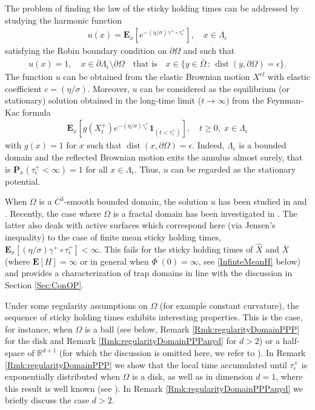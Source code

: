 \documentclass[11pt,a4paper]{article}
\begin{document}
{The problem of finding the law of the sticky holding times can be addressed by studying the harmonic function
\begin{align*}
u(x) = \mathbf{E}_x \left[ e^{-(\eta /\sigma) \gamma^+ \circ \tau^+_\epsilon} \right], \quad x \in \Lambda_\epsilon
\end{align*}
satisfying the Robin boundary condition on $\partial \Omega$ and such that 
\begin{align*}
u(x)=1, \quad x \in \partial \Lambda_\epsilon \setminus \partial \Omega \quad \textrm{that is} \quad x \in \{y \in \bar{\Omega}\,:\, \operatorname{dist}(y, \partial \Omega)=\epsilon\}.
\end{align*}
The function $u$ can be  obtained from the elastic Brownian motion $X^{el}$ with elastic coefficient $c=(\eta/\sigma)$. Moreover, $u$ can be considered as the equilibrium (or stationary) solution obtained in the long-time limit ($t\to \infty$) from the Feynman-Kac formula 
\begin{align*}
\mathbf{E}_x \left[ g(X^+_t) e^{-(\eta/\sigma) \gamma^+_t}\mathbf{1}_{(t < \tau^+_\epsilon)} \right], \quad t\geq 0,\; x \in \Lambda_\epsilon
\end{align*}
with $g(x)=1$ for $x$ such that $\operatorname{dist}(x, \partial \Omega) = \epsilon$. Indeed, $\Lambda_\epsilon$ is a bounded domain and the reflected Brownian motion exits the annulus almost surely, that is $\mathbf{P}_x(\tau^+_\epsilon < \infty) = 1$  for all $x \in \Lambda_\epsilon$. Thus, $u$ can be regarded as the stationary potential.

When $\Omega$ is a $C^3$-smooth bounded domain, the solution $u$ has been studied in \cite{MS90} and \cite{Pap90}. Recently, the case where $\Omega$ is a fractal domain has been investigated in \cite{BBC08}. The latter also deals with active surfaces which correspond here (via Jensen's inequality) to the case of finite mean sticky holding times, $\mathbf{E}_{x}[(\eta/\sigma)\gamma^+ \circ \tau^+_\epsilon] < \infty$. This fails for the sticky holding times of $\hat{X}$ and $\bar{X}$ (where $\mathbf{E}[H] = \infty$ or in general when $\Phi^\prime(0)=\infty$, see \eqref{InfinteMeanH} below) and provides a characterization of trap domains in line with the discussion in Section \ref{Sec:ConOP}.   

Under some regularity assumptions on $\Omega$ (for example constant curvature), the sequence of sticky holding times exhibits interesting properties. This is the case, for instance, when $\Omega$ is a ball (see below, Remark \ref{Rmk:regularityDomainPPP} for the disk and Remark \ref{Rmk:regularityDomainPPPanyd} for $d>2$) or a half-space of $\mathbb{R}^{d+1}$ (for which the discussion is omitted here, we refer to \cite{Watanabe79}). In Remark \ref{Rmk:regularityDomainPPP} we show that the local time accumulated until $\tau^+_\epsilon$ is exponentially distributed when $\Omega$ is a disk, as well as in dimension $d=1$, where this result is well known (see \cite[Theorem 7.7]{ChugWilliams}). In Remark \ref{Rmk:regularityDomainPPPanyd} we briefly discuss the case $d>2$.

}
\end{document}
